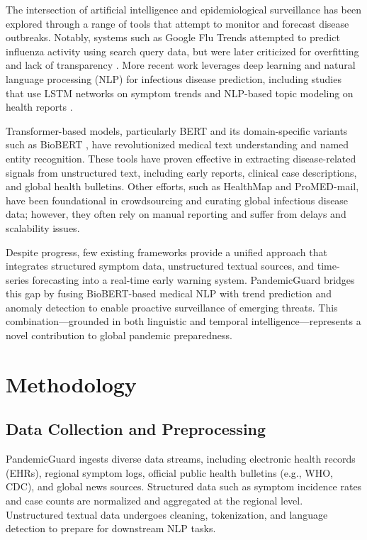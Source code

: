 \documentclass[11pt]{article}
\newcommand{\modelname}{PandemicGuard\xspace}
\begin{document}
The intersection of artificial intelligence and epidemiological surveillance has been explored through a range of tools that attempt to monitor and forecast disease outbreaks. Notably, systems such as Google Flu Trends attempted to predict influenza activity using search query data, but were later criticized for overfitting and lack of transparency \cite{lazer2014parable}. More recent work leverages deep learning and natural language processing (NLP) for infectious disease prediction, including studies that use LSTM networks on symptom trends \cite{adikari2021forecasting} and NLP-based topic modeling on health reports \cite{nguyen2020epidemics}.

Transformer-based models, particularly BERT and its domain-specific variants such as BioBERT \cite{lee2020biobert}, have revolutionized medical text understanding and named entity recognition. These tools have proven effective in extracting disease-related signals from unstructured text, including early reports, clinical case descriptions, and global health bulletins. Other efforts, such as HealthMap and ProMED-mail, have been foundational in crowdsourcing and curating global infectious disease data; however, they often rely on manual reporting and suffer from delays and scalability issues.

Despite progress, few existing frameworks provide a unified approach that integrates structured symptom data, unstructured textual sources, and time-series forecasting into a real-time early warning system. \modelname bridges this gap by fusing BioBERT-based medical NLP with trend prediction and anomaly detection to enable proactive surveillance of emerging threats. This combination—grounded in both linguistic and temporal intelligence—represents a novel contribution to global pandemic preparedness.

\section{Methodology}

\subsection{Data Collection and Preprocessing}

\modelname ingests diverse data streams, including electronic health records (EHRs), regional symptom logs, official public health bulletins (e.g., WHO, CDC), and global news sources. Structured data such as symptom incidence rates and case counts are normalized and aggregated at the regional level. Unstructured textual data undergoes cleaning, tokenization, and language detection to prepare for downstream NLP tasks.
\end{document}
